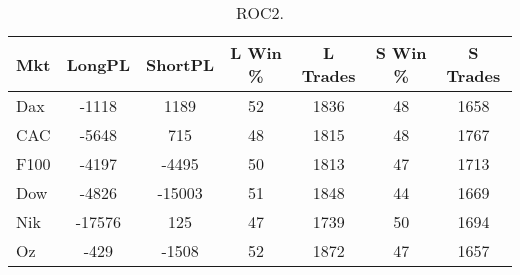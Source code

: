 \begin{table}[ht]
\centering
\caption[ROC2]{ROC2.} 
\label{tab:mac_ob_results}
\begin{tabular}{lcccccc}
  \toprule Mkt & LongPL & ShortPL & L Win \% & L Trades & S Win \% & S Trades \\ 
  \midrule Dax & -1118 & 1189 & 52 & 1836 & 48 & 1658 \\ 
  CAC & -5648 & 715 & 48 & 1815 & 48 & 1767 \\ 
  F100 & -4197 & -4495 & 50 & 1813 & 47 & 1713 \\ 
  Dow & -4826 & -15003 & 51 & 1848 & 44 & 1669 \\ 
  Nik & -17576 & 125 & 47 & 1739 & 50 & 1694 \\ 
  Oz & -429 & -1508 & 52 & 1872 & 47 & 1657 \\ 
   \bottomrule \end{tabular}
\end{table}
